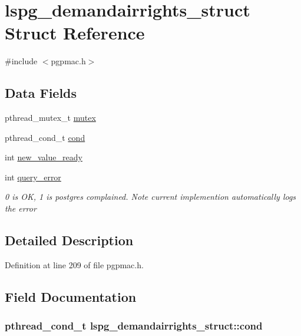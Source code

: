 \hypertarget{structlspg__demandairrights__struct}{\section{lspg\-\_\-demandairrights\-\_\-struct Struct Reference}
\label{structlspg__demandairrights__struct}
}


{\ttfamily \#include $<$pgpmac.\-h$>$}

\subsection*{Data Fields}
\begin{DoxyCompactItemize}
\item 
pthread\-\_\-mutex\-\_\-t \hyperlink{structlspg__demandairrights__struct_a874970af767d4bb329f9764075b30096}{mutex}
\item 
pthread\-\_\-cond\-\_\-t \hyperlink{structlspg__demandairrights__struct_addc1e3476a3f282a19b335f7875861d1}{cond}
\item 
int \hyperlink{structlspg__demandairrights__struct_ad686c9a04d0c7e10b236c234eaf03ce7}{new\-\_\-value\-\_\-ready}
\item 
int \hyperlink{structlspg__demandairrights__struct_ae3d1f2e51c623ecefefd87728905475d}{query\-\_\-error}
\begin{DoxyCompactList}\small\item\em 0 is O\-K, 1 is postgres complained. Note current implemention automatically logs the error \end{DoxyCompactList}\end{DoxyCompactItemize}


\subsection{Detailed Description}


Definition at line 209 of file pgpmac.\-h.



\subsection{Field Documentation}
\hypertarget{structlspg__demandairrights__struct_addc1e3476a3f282a19b335f7875861d1}{
\subsubsection[{cond}]{\setlength{\rightskip}{0pt plus 5cm}pthread\-\_\-cond\-\_\-t lspg\-\_\-demandairrights\-\_\-struct\-::cond}}\label{structlspg__demandairrights__struct_addc1e3476a3f282a19b335f7875861d1}


